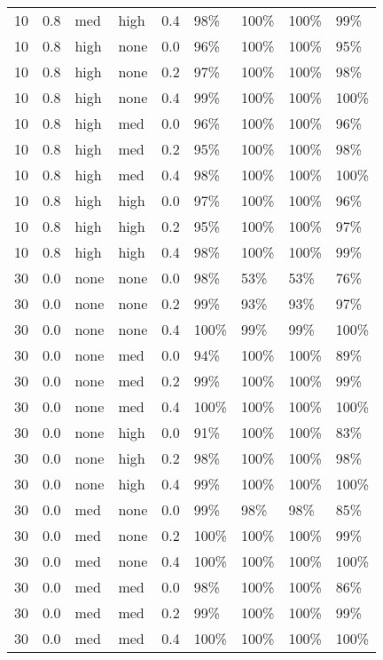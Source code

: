 \begin{longtable}{rrllrllll}
  10 & 0.8 & med & high & 0.4 & 98\% & 100\% & 100\% & 99\% \\ 
  10 & 0.8 & high & none & 0.0 & 96\% & 100\% & 100\% & 95\% \\ 
  10 & 0.8 & high & none & 0.2 & 97\% & 100\% & 100\% & 98\% \\ 
  10 & 0.8 & high & none & 0.4 & 99\% & 100\% & 100\% & 100\% \\ 
  10 & 0.8 & high & med & 0.0 & 96\% & 100\% & 100\% & 96\% \\ 
  10 & 0.8 & high & med & 0.2 & 95\% & 100\% & 100\% & 98\% \\ 
  10 & 0.8 & high & med & 0.4 & 98\% & 100\% & 100\% & 100\% \\ 
  10 & 0.8 & high & high & 0.0 & 97\% & 100\% & 100\% & 96\% \\ 
  10 & 0.8 & high & high & 0.2 & 95\% & 100\% & 100\% & 97\% \\ 
  10 & 0.8 & high & high & 0.4 & 98\% & 100\% & 100\% & 99\% \\ 
  30 & 0.0 & none & none & 0.0 & 98\% & 53\% & 53\% & 76\% \\ 
  30 & 0.0 & none & none & 0.2 & 99\% & 93\% & 93\% & 97\% \\ 
  30 & 0.0 & none & none & 0.4 & 100\% & 99\% & 99\% & 100\% \\ 
  30 & 0.0 & none & med & 0.0 & 94\% & 100\% & 100\% & 89\% \\ 
  30 & 0.0 & none & med & 0.2 & 99\% & 100\% & 100\% & 99\% \\ 
  30 & 0.0 & none & med & 0.4 & 100\% & 100\% & 100\% & 100\% \\ 
  30 & 0.0 & none & high & 0.0 & 91\% & 100\% & 100\% & 83\% \\ 
  30 & 0.0 & none & high & 0.2 & 98\% & 100\% & 100\% & 98\% \\ 
  30 & 0.0 & none & high & 0.4 & 99\% & 100\% & 100\% & 100\% \\ 
  30 & 0.0 & med & none & 0.0 & 99\% & 98\% & 98\% & 85\% \\ 
  30 & 0.0 & med & none & 0.2 & 100\% & 100\% & 100\% & 99\% \\ 
  30 & 0.0 & med & none & 0.4 & 100\% & 100\% & 100\% & 100\% \\ 
  30 & 0.0 & med & med & 0.0 & 98\% & 100\% & 100\% & 86\% \\ 
  30 & 0.0 & med & med & 0.2 & 99\% & 100\% & 100\% & 99\% \\ 
  30 & 0.0 & med & med & 0.4 & 100\% & 100\% & 100\% & 100\% \\ 

\end{longtable}
